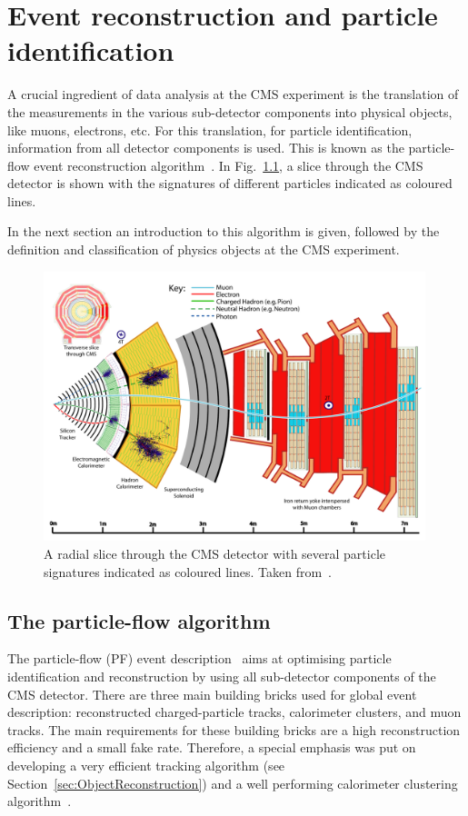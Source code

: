\chapter{Event reconstruction and particle identification}
A crucial ingredient of data analysis at the CMS experiment is the translation of the measurements in the various sub-detector components into physical objects, like muons, electrons, etc.
For this translation, \ie for particle identification, information from all detector components is used.
This is known as the particle-flow event reconstruction algorithm~\cite{CMS-PAS-PFT-09-001}.
In Fig.~\ref{fig:CMSslice}, a slice through the CMS detector is shown with the signatures of different particles indicated as coloured lines.

In the next section an introduction to this algorithm is given, followed by the definition and classification of physics objects at the CMS experiment.
\begin{figure}[!ht]
  \centering
      \includegraphics[width=0.99\textwidth]{figures/experiment/ObjectReconstruction/slice_white_smaller_size.pdf}
  \caption{A radial slice through the CMS detector with several particle signatures indicated as coloured lines. Taken from~\cite{bib:Signatures_figure}.}  
  \label{fig:CMSslice}
\end{figure}


\section{The particle-flow algorithm}
\label{sec:PFalgorithm}
The particle-flow (PF) event description~\cite{CMS-PAS-PFT-09-001} aims at optimising particle identification and reconstruction by using all sub-detector components of the CMS detector.
There are three main building bricks used for global event description: reconstructed charged-particle tracks, calorimeter clusters, and muon tracks.
The main requirements for these building bricks are a high reconstruction efficiency and a small fake rate.
Therefore, a special emphasis was put on developing a very efficient tracking algorithm (see Section~\ref{sec:ObjectReconstruction}) and a well performing calorimeter clustering algorithm~\cite{CMS-PAS-PFT-09-001}. 

